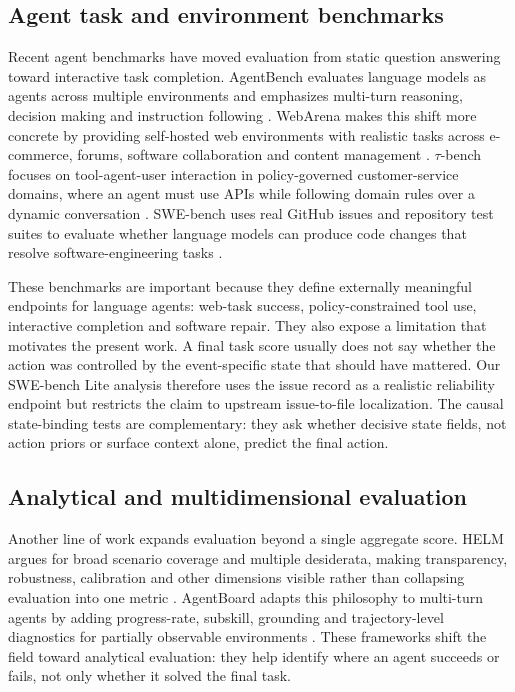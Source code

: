 ﻿\documentclass[preprint,12pt,authoryear]{elsarticle}
\begin{document}
\subsection{Agent task and environment benchmarks}

Recent agent benchmarks have moved evaluation from static question answering toward interactive task completion. AgentBench evaluates language models as agents across multiple environments and emphasizes multi-turn reasoning, decision making and instruction following \citep{liu2024agentbench}. WebArena makes this shift more concrete by providing self-hosted web environments with realistic tasks across e-commerce, forums, software collaboration and content management \citep{zhou2024webarena}. \(\tau\)-bench focuses on tool-agent-user interaction in policy-governed customer-service domains, where an agent must use APIs while following domain rules over a dynamic conversation \citep{yao2025taubench}. SWE-bench uses real GitHub issues and repository test suites to evaluate whether language models can produce code changes that resolve software-engineering tasks \citep{jimenez2024swebench}.

These benchmarks are important because they define externally meaningful endpoints for language agents: web-task success, policy-constrained tool use, interactive completion and software repair. They also expose a limitation that motivates the present work. A final task score usually does not say whether the action was controlled by the event-specific state that should have mattered. Our SWE-bench Lite analysis therefore uses the issue record as a realistic reliability endpoint but restricts the claim to upstream issue-to-file localization. The causal state-binding tests are complementary: they ask whether decisive state fields, not action priors or surface context alone, predict the final action.

\subsection{Analytical and multidimensional evaluation}

Another line of work expands evaluation beyond a single aggregate score. HELM argues for broad scenario coverage and multiple desiderata, making transparency, robustness, calibration and other dimensions visible rather than collapsing evaluation into one metric \citep{liang2023helm}. AgentBoard adapts this philosophy to multi-turn agents by adding progress-rate, subskill, grounding and trajectory-level diagnostics for partially observable environments \citep{ma2024agentboard}. These frameworks shift the field toward analytical evaluation: they help identify where an agent succeeds or fails, not only whether it solved the final task.
\end{document}

